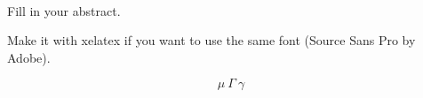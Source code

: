 \vspace*{3cm}
\begin{center}
\\[10pt]
\end{center}
Fill in your abstract.

Make it with xelatex if you want to use the same font (Source Sans Pro by Adobe).

\begin{equation}
\mu ~ \Gamma ~ \gamma
\end{equation}

\setcounter{page}{1}
\thispagestyle{empty}
\pagestyle{empty}
\cleardoublepage
